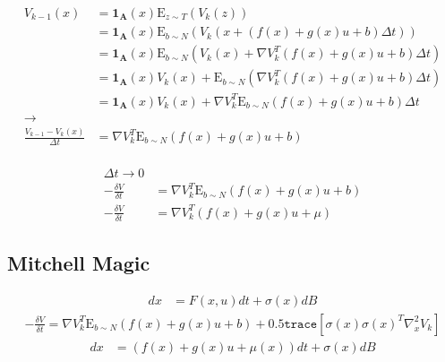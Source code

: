 \documentclass[a4paper]{article}
\begin{document}
\begin{align*}
V_{k-1}(x) & = \mathbf{1_A}(x) \mathrm{E}_{z \sim T} (V_k(z))
\\ & = \mathbf{1_A}(x) \mathrm{E}_{b\sim N} (V_k( x + (f(x) + g(x) u + b) \Delta t) )
\\ & = \mathbf{1_A}(x) \mathrm{E}_{b\sim N} (V_k( x ) + \nabla V_k^T (f(x) + g(x) u + b) \Delta t )
\\ & = \mathbf{1_A}(x) V_k(x) + \mathrm{E}_{b\sim N} ( \nabla V_k^T (f(x) + g(x) u + b) \Delta t )
\\ & = \mathbf{1_A}(x) V_k(x) + \nabla V_k^T \mathrm{E}_{b\sim N} ( f(x) + g(x) u + b ) \Delta t
\\ \rightarrow
\\ \frac{V_{k-1} - V_k(x)}{\Delta t} &= \nabla V_k^T \mathrm{E}_{b\sim N} ( f(x) + g(x) u + b )
\end{align*}

\begin{align*}
\\ \Delta t \rightarrow 0
\\ -\frac{\delta V}{\delta t} &= \nabla V_k^T \mathrm{E}_{b\sim N} ( f(x) + g(x) u + b )
\\ -\frac{\delta V}{\delta t} &= \nabla V_k^T ( f(x) + g(x) u + \mu )
\end{align*}

\subsection{Mitchell Magic}

\begin{align*}
dx &= F(x,u) dt + \sigma(x) dB
\end{align*}
\begin{align*}
-\frac{\delta V}{\delta t} = \nabla V_k^T \mathrm{E}_{b\sim N} ( f(x) + g(x) u + b ) + 0.5 \texttt{trace} [\sigma(x) \sigma(x)^T \nabla^2_x V_k]
\end{align*}
\begin{align*}
dx &= (f(x) + g(x) u + \mu(x) ) dt + \sigma(x) dB
\end{align*}
\end{document}
